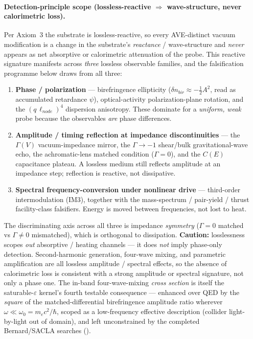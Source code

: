 \paragraph{Detection-principle scope (lossless-reactive $\Rightarrow$ wave-structure, never calorimetric loss).}
Per Axiom~3 the substrate is lossless-reactive, so every AVE-distinct vacuum modification is a change in the substrate's \emph{reactance} / wave-structure and \emph{never} appears as net absorptive or calorimetric attenuation of the probe. This reactive signature manifests across \emph{three} lossless observable families, and the falsification programme below draws from all three:
\begin{enumerate}
    \item \textbf{Phase / polarization} --- birefringence ellipticity ($\delta n_{bir}\approx-\tfrac12 A^2$, read as accumulated retardance $\psi$), optical-activity polarization-plane rotation, and the $(q\,\ell_{node})^4$ dispersion anisotropy. These dominate for a \emph{uniform, weak} probe because the observables \emph{are} phase differences.
    \item \textbf{Amplitude / timing reflection at impedance discontinuities} --- the $\Gamma(V)$ vacuum-impedance mirror, the $\Gamma\to-1$\gammaundeclared{} shear/bulk gravitational-wave echo, the achromatic-lens matched condition ($\Gamma=0$), and the $C(E)$ capacitance plateau. A lossless medium still reflects amplitude at an impedance step; reflection is reactive, not dissipative.
    \item \textbf{Spectral frequency-conversion under nonlinear drive} --- third-order intermodulation (IM3), together with the mass-spectrum / pair-yield / thrust facility-class falsifiers. Energy is moved between frequencies, not lost to heat.
\end{enumerate}
The discriminating axis across all three is impedance \emph{symmetry} ($\Gamma=0$ matched vs $\Gamma\neq0$ mismatched), which is orthogonal to dissipation. \textbf{Caution:} losslessness scopes \emph{out} absorptive / heating channels --- it does \emph{not} imply phase-only detection. Second-harmonic generation, four-wave mixing, and parametric amplification are all lossless amplitude / spectral effects, so the absence of calorimetric loss is consistent with a strong amplitude or spectral signature, not only a phase one. The in-band four-wave-mixing \emph{cross section} is itself the saturable-$\varepsilon$ kernel's fourth testable consequence --- enhanced over QED by the \emph{square} of the matched-differential birefringence amplitude ratio wherever $\omega\ll\omega_0=m_ec^2/\hbar$, scoped as a low-frequency effective description (collider light-by-light out of domain), and left unconstrained by the completed Bernard/SACLA searches ().

